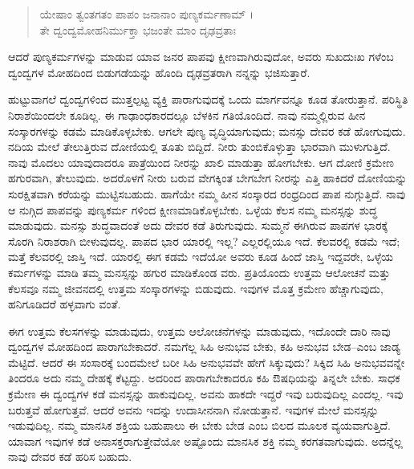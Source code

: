 \begin{verse}
ಯೇಷಾಂ ತ್ವಂತಗತಂ ಪಾಪಂ ಜನಾನಾಂ ಪುಣ್ಯಕರ್ಮಣಾಮ್ ।\\ತೇ ದ್ವಂದ್ವಮೋಹನಿರ್ಮುಕ್ತಾ ಭಜಂತೇ ಮಾಂ ದೃಢವ್ರತಾಃ 
\end{verse}

{\small ಆದರೆ ಪುಣ್ಯಕರ್ಮಗಳನ್ನು ಮಾಡುವ ಯಾವ ಜನರ ಪಾಪವು ಕ್ಷೀಣವಾಗಿರುವುದೋ, ಅವರು ಸುಖದುಃಖ ಗಳೆಂಬ ದ್ವಂದ್ವಗಳ ಮೋಹದಿಂದ ಬಿಡುಗಡೆಯನ್ನು ಹೊಂದಿ ದೃಢವ್ರತರಾಗಿ ನನ್ನನ್ನು ಭಜಿಸುತ್ತಾರೆ.}

ಹುಟ್ಟುವಾಗಲೆ ದ್ವಂದ್ವಗಳಿಂದ ಮುತ್ತಲ್ಪಟ್ಟ ವ್ಯಕ್ತಿ ಪಾರಾಗುವುದಕ್ಕೆ ಒಂದು ಮಾರ್ಗವನ್ನೂ ಕೂಡ ತೋರುತ್ತಾನೆ. ಪರಿಸ್ಥಿತಿ ನಿರಾಶೆಯಿಂದಲೇ ಕೂಡಿಲ್ಲ. ಈ ಗಾಢಾಂಧಕಾರದಲ್ಲೂ ಬೆಳಕಿನ ಗತಿಯೊಂದಿದೆ. ನಾವು ನಮ್ಮಲ್ಲಿರುವ ಹೀನ ಸಂಸ್ಕಾರಗಳನ್ನು ಕಡಮೆ ಮಾಡಿಕೊಳ್ಳಬೇಕು. ಆಗಲೇ ಪುಣ್ಯ ವೃದ್ಧಿಯಾಗುವುದು; ಮನಸ್ಸು ದೇವರ ಕಡೆ ಹೋಗುವುದು. ನದಿಯ ಮೇಲೆ ತೇಲುತ್ತಿರುವ ದೋಣಿಯಲ್ಲಿ ತೂತು ಬಿದ್ದಿದೆ. ನೀರು ತುಂಬಿಕೊಳ್ಳುತ್ತಾ ಭಾರವಾಗಿ ಮುಳುಗುತ್ತಿದೆ. ನಾವು ಮೊದಲು ಯಾವುದಾದರೂ ಪಾತ್ರೆಯಿಂದ ನೀರನ್ನು ಖಾಲಿ ಮಾಡುತ್ತಾ ಹೋಗಬೇಕು. ಆಗ ದೋಣಿ ಕ್ರಮೇಣ ಹಗುರವಾಗಿ, ತೇಲುವುದು. ಅದರೊಳಗೆ ನೀರು ಬರುವ ವೇಗಕ್ಕಿಂತ ಬೇಗಬೇಗ ನೀರನ್ನು ಎತ್ತಿ ಹಾಕಿದರೆ ದೋಣಿಯನ್ನು ಸುರಕ್ಷಿತವಾಗಿ ಕರೆಯನ್ನು ಮುಟ್ಟಿಸಬಹುದು. ಹಾಗೆಯೇ ನಮ್ಮ ಹೀನ ಸಂಸ್ಕಾರದ ರಂಧ್ರದಿಂದ ಪಾಪ ನುಗ್ಗುತ್ತಿದೆ. ನಾವು ಆ ನುಗ್ಗಿದ ಪಾಪವನ್ನು ಪುಣ್ಯಕರ್ಮ ಗಳಿಂದ ಕ್ಷೀಣಮಾಡಿಕೊಳ್ಳಬೇಕು. ಒಳ್ಳೆಯ ಕೆಲಸ ನಮ್ಮ ಮನಸ್ಸನ್ನು ಶುದ್ಧ ಮಾಡುವುದು. ಮನಸ್ಸು ಶುದ್ಧವಾದಂತೆ ಅದು ದೇವರ ಕಡೆ ತಿರುಗುವುದು. ಸುಮ್ಮನೆ ಈಗಿರುವ ಪಾಪಗಳ ಭಾರಕ್ಕೆ ಸೊರಗಿ ನಿರಾಶರಾಗಿ ಬೀಳುವುದಲ್ಲ. ಪಾಪದ ಭಾರ ಯಾರಲ್ಲಿ ಇಲ್ಲ? ಎಲ್ಲರಲ್ಲಿಯೂ ಇದೆ. ಕೆಲವರಲ್ಲಿ ಕಡಮೆ ಇದೆ; ಮತ್ತೆ ಕೆಲವರಲ್ಲಿ ಜಾಸ್ತಿ ಇದೆ. ಯಾರಲ್ಲಿ ಈಗ ಕಡಮೆ ಇದೆಯೋ ಅವರು ಕೂಡ ಹಿಂದೆ ಜಾಸ್ತಿ ಇದ್ದವರೇ, ಒಳ್ಳೆಯ ಕರ್ಮಗಳನ್ನು ಮಾಡಿ ತಮ್ಮ ಮನಸ್ಸನ್ನು ಹಗುರ ಮಾಡಿಕೊಂಡ ವರು. ಪ್ರತಿಯೊಂದು ಉತ್ತಮ ಆಲೋಚನೆ ಮತ್ತು ಕೆಲಸವೂ ನಮ್ಮ ಜೀವನದಲ್ಲಿ ಉತ್ತಮ ಸಂಸ್ಕಾರಗಳನ್ನು ಬಿಡುವುದು. ಇವುಗಳ ಮೊತ್ತ ಕ್ರಮೇಣ ಹೆಚ್ಚಾಗುವುದು, ಹನಿಗೂಡಿದರೆ ಹಳ್ಳವಾಗು ವಂತೆ.

ಈಗ ಉತ್ತಮ ಕೆಲಸಗಳನ್ನು ಮಾಡುವುದು, ಉತ್ತಮ ಆಲೋಚನೆಗಳನ್ನು ಮಾಡುವುದು, ಇದೊಂದೇ ದಾರಿ ನಾವು ದ್ವಂದ್ವಗಳ ಮೋಹದಿಂದ ಪಾರಾಗಬೇಕಾದರೆ. ನಮಗೆಲ್ಲ ಸಿಹಿ ಅನುಭವ ಬೇಕು, ಕಹಿ ಅನುಭವ ಬೇಡ–ಎಂಬ ಜಾಡ್ಯ ಮೆಟ್ಟಿದೆ. ಆದರೆ ಈ ಸಂಸಾರಕ್ಕೆ ಬಂದಮೇಲೆ ಬರೀ ಸಿಹಿ ಅನುಭವವೇ ಹೇಗೆ ಸಿಕ್ಕುವುದು? ಸಿಕ್ಕಿದ ಸಿಹಿ ಅನುಭವವನ್ನೇ ತಿಂದರೂ ಅದು ನಮ್ಮ ದೇಹಕ್ಕೆ ಕೆಟ್ಟದ್ದು. ಅದರಿಂದ ಪಾರಾಗಬೇಕಾದರೂ ಕಹಿ ಔಷಧಿಯನ್ನು ತಿನ್ನಲೇ ಬೇಕು. ಸಾಧಕ ಕ್ರಮೇಣ ಈ ದ್ವಂದ್ವಗಳ ಕಡೆ ಮನಸ್ಸನ್ನು ಹಾಕುವುದಿಲ್ಲ. ಅವನು ಹಾಕದೇ ಇದ್ದರೆ ಇವು ಬರುವುದಿಲ್ಲ ಎಂದಲ್ಲ. ಇವು ಬರುತ್ತವೆ ಹೋಗುತ್ತವೆ. ಆದರೆ ಅವನು ಇದನ್ನು ಉದಾಸೀನನಾಗಿ ನೋಡುತ್ತಾನೆ. ಇವುಗಳ ಮೇಲೆ ಮನಸ್ಸನ್ನು ಇಡುವುದಿಲ್ಲ. ನಮ್ಮ ಮಾನಸಿಕ ಶಕ್ತಿಯ ಬಹುಪಾಲು ಈ ಬೇಕು ಬೇಡ ಎಂಬ ಬಿಲದ ಮೂಲಕ ವ್ಯಯವಾಗುತ್ತಿದೆ. ಯಾವಾಗ ಇವುಗಳ ಕಡೆ ಅನಾಸಕ್ತರಾಗುತ್ತೇವೆಯೋ ಅಷ್ಟೊಂದು ಮಾನಸಿಕ ಶಕ್ತಿ ನಮ್ಮ ಕರಗತವಾಗುವುದು. ಅದನ್ನೆಲ್ಲ ನಾವು ದೇವರ ಕಡೆ ಹರಿಸ ಬಹುದು.

